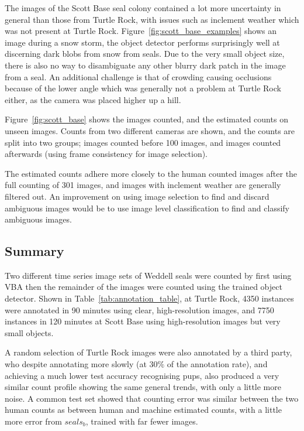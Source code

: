 The images of the Scott Base seal colony contained a lot more uncertainty in general than those from Turtle Rock, with issues such as inclement weather which was not present at Turtle Rock. Figure~\ref{fig:scott_base_examples} shows an image during a snow storm, the object detector performs surprisingly well at discerning dark blobs from snow from seals. Due to the very small object size, there is also no way to disambiguate any other blurry dark patch in the image from a seal. An additional challenge is that of crowding causing occlusions because of the lower angle which was generally not a problem at Turtle Rock either, as the camera was placed higher up a hill.

Figure~\ref{fig:scott_base} shows the images counted, and the estimated counts on unseen images. Counts from two different cameras are shown, and the counts are split into two groups; images counted before 100 images, and images counted afterwards (using frame consistency for image selection). 

The estimated counts adhere more closely to the human counted images after the full counting of 301 images, and images with inclement weather are generally filtered out. An improvement on using image selection to find and discard ambiguous images would be to use image level classification to find and classify ambiguous images. 


\subsection{Summary}
\label{sec:seals_summary}

Two different time series image sets of Weddell seals were counted by first using \gls{VBA} then the remainder of the images were counted using the trained object detector. Shown in Table~\ref{tab:annotation_table}, at Turtle Rock, 4350 instances were annotated in 90 minutes using clear, high-resolution images, and 7750 instances in 120 minutes at Scott Base using high-resolution images but very small objects. 

A random selection of Turtle Rock images were also annotated by a third party, who despite annotating more slowly (at $30\%$ of the annotation rate), and achieving a much lower test accuracy recognising pups, also produced a very similar count profile showing the same general trends, with only a little more noise. A common test set showed that counting error was similar between the two human counts as between human and machine estimated counts, with a little more error from $seals_b$, trained with far fewer images.

